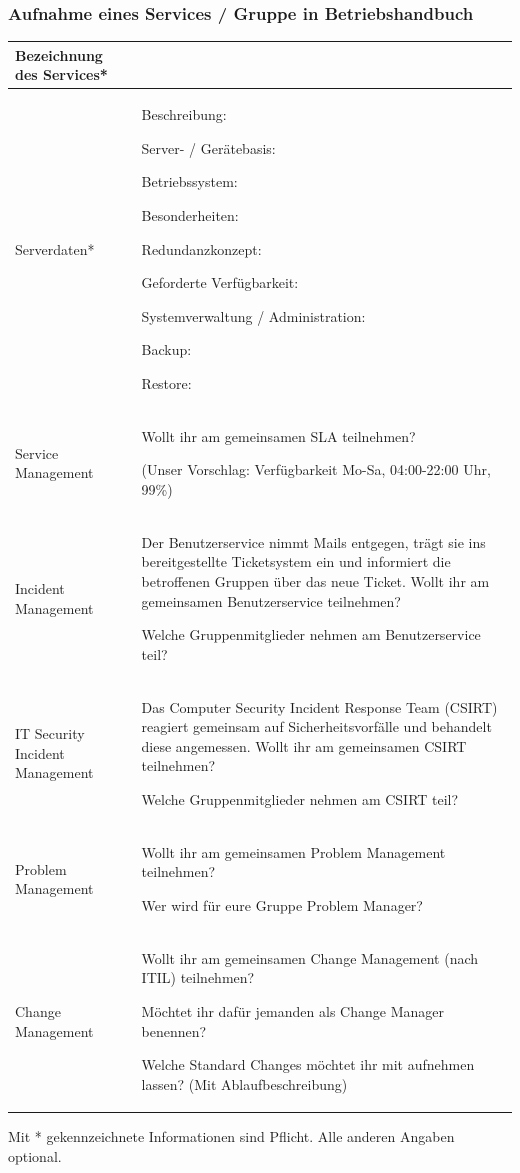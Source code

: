 \documentclass[]{article}
\begin{document}
\subsubsection{Aufnahme eines Services / Gruppe in
Betriebshandbuch}\label{aufnahme-eines-services-gruppe-in-betriebshandbuch}

\begin{longtable}{lp{6cm}}
\toprule
Bezeichnung des Services* &\tabularnewline
\midrule
Serverdaten* & Beschreibung:

Server- / Gerätebasis:

Betriebssystem:

Besonderheiten:

Redundanzkonzept:

Geforderte Verfügbarkeit:

Systemverwaltung / Administration:

Backup:

Restore:\tabularnewline
Service Management & Wollt ihr am gemeinsamen SLA teilnehmen?

(Unser Vorschlag: Verfügbarkeit Mo-Sa, 04:00-22:00 Uhr,
99\%)\tabularnewline
Incident Management & Der Benutzerservice nimmt Mails entgegen, trägt
sie ins bereitgestellte Ticketsystem ein und informiert die betroffenen
Gruppen über das neue Ticket. Wollt ihr am gemeinsamen Benutzerservice
teilnehmen?

Welche Gruppenmitglieder nehmen am Benutzerservice teil?\tabularnewline
IT Security Incident Management & Das Computer Security Incident
Response Team (CSIRT) reagiert gemeinsam auf Sicherheitsvorfälle und
behandelt diese angemessen. Wollt ihr am gemeinsamen CSIRT teilnehmen?

Welche Gruppenmitglieder nehmen am CSIRT teil?\tabularnewline
Problem Management & Wollt ihr am gemeinsamen Problem Management
teilnehmen?

Wer wird für eure Gruppe Problem Manager?\tabularnewline
Change Management & Wollt ihr am gemeinsamen Change Management (nach
ITIL) teilnehmen?

Möchtet ihr dafür jemanden als Change Manager benennen?

Welche Standard Changes möchtet ihr mit aufnehmen lassen? (Mit
Ablaufbeschreibung)\tabularnewline
\bottomrule
\end{longtable}

Mit * gekennzeichnete Informationen sind Pflicht. Alle anderen Angaben
optional.

\subsection{}\label{section}
\newpage
\end{document}
